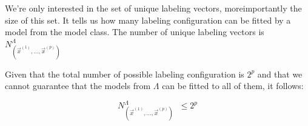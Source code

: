 \begin{frame}
\begin{itemize}
		We're only interested in the set of unique labeling vectors, moreimportantly the size of this set. It tells us how many labeling configuration can be fitted by a model from the model class.
		The number of unique labeling vectors is 
		$N_{(\vec{x}^{(1)}, \ldots, \vec{x}^{(p)})}^\Lambda$
		
		Given that the total number of possible labeling configuration is $2^p$
		and that we cannot guarantee that the models from $\Lambda$ can be fitted to all of them, it follows:
		
			\begin{equation}
				N_{(\vec{x}^{(1)}, \ldots, \vec{x}^{(p)})}^\Lambda
				\;\;\leq 2^p 
			\end{equation}
		
			
	\end{itemize}
\end{frame}

